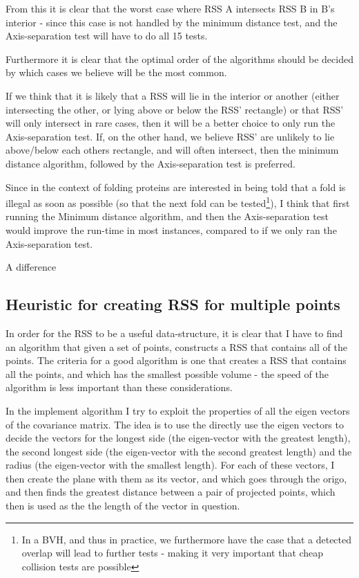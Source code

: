From this it is clear that the worst case where RSS A intersects RSS B in B's interior - since this case is not handled by the minimum distance test, and the Axis-separation test will have to do all 15 tests.

Furthermore it is clear that the optimal order of the algorithms should be decided by which cases we believe will be the most common. 

If we think that it is likely that a RSS will lie in the interior or another (either intersecting the other, or lying above or below the RSS' rectangle) or that RSS' will only intersect in rare cases, then it will be a better choice to only run the Axis-separation test. If, on the other hand, we believe RSS' are unlikely to lie above/below each others rectangle, and will often intersect, then the minimum distance algorithm, followed by the Axis-separation test is preferred.

Since in the context of folding proteins are interested in being told that a fold is illegal as soon as possible (so that the next fold can be tested\footnote{In a BVH, and thus in practice, we furthermore have the case that a detected overlap will lead to further tests - making it very important that cheap collision tests are possible}), I think that first running the Minimum distance algorithm, and then the Axis-separation test would improve the run-time in most instances, compared to if we only ran the Axis-separation test.

A difference 

\subsection{Heuristic for creating RSS for multiple points}
In order for the RSS to be a useful data-structure, it is clear that I have to find an algorithm that given a set of points, constructs a RSS that contains all of the points. The criteria for a good algorithm is one that creates a RSS that contains all the points, and which has the smallest possible volume - the speed of the algorithm is less important than these considerations.

In the implement algorithm I try to exploit the properties of all the eigen vectors of the covariance matrix. The idea is to use the directly use the eigen vectors to decide the vectors for the longest side (the eigen-vector with the greatest length), the second longest side (the eigen-vector with the second greatest length) and the radius (the eigen-vector with the smallest length). For each of these vectors, I then create the plane with them as its vector, and which goes through the origo, and then finds the greatest distance between a pair of projected points, which then is used as the the length of the vector in question.

